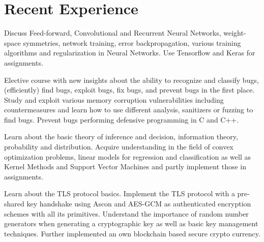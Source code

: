\documentclass[]{resume}
\begin{document}
\begin{minipage}[t]{0.66\textwidth}
\begin{tightemize}
\end{tightemize}
\sectionsep
\section{Recent Experience}
Discuss Feed-forward, Convolutional and Recurrent Neural Networks, weight-space symmetries, network training, error backpropagation, various training algorithms and regularization in Neural Networks. Use Tensorflow and Keras for assignments. \sectionsep

Elective course with new insights about the ability to recognize and classify bugs, (efficiently) find bugs, exploit bugs, fix bugs, and prevent bugs in the first place. Study and exploit various memory corruption vulnerabilities including countermeasures and learn how to use different analysis, sanitizers or fuzzing to find bugs. Prevent bugs performing defensive programming in C and C++. \sectionsep

Learn about the basic theory of inference and decision, information theory, probability and distribution. Acquire understanding in the field of convex optimization problems, linear models for regression and classification as well as Kernel Methods and Support Vector Machines and partly implement those in assignments. \sectionsep

Learn about the TLS protocol basics. Implement the TLS protocol with a pre-shared key handshake using Ascon and AES-GCM as authenticated encryption schemes with all its primitives. Understand the importance of random number generators when generating a cryptographic key as well as basic key management techniques. Further implemented an own blockchain based secure crypto currency. \sectionsep
\end{minipage}
\vfill \vfill \vfill \vfill
\pagebreak
\end{document}
